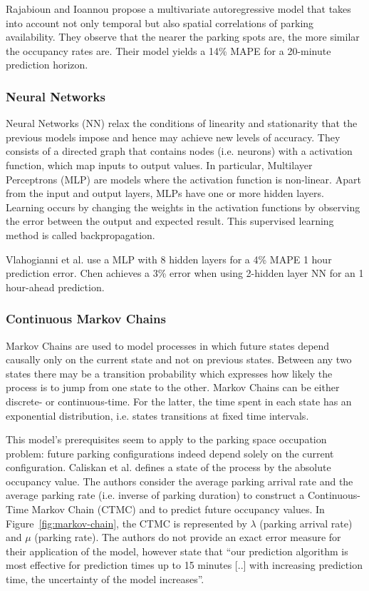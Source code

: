 \documentclass{article}
\begin{document}
\vspace{2mm}
Rajabioun and Ioannou\cite{Rajabioun} propose a multivariate autoregressive model that takes into account not only temporal but also spatial correlations of parking availability. They observe that the nearer the parking spots are, the more similar the occupancy rates are. Their model yields a 14\% MAPE for a 20-minute prediction horizon.

\subsubsection{Neural Networks}
\label{sec:neural-networks}
Neural Networks (NN) relax the conditions of linearity and stationarity that the previous models impose and hence may achieve new levels of accuracy. They consists of a directed graph that contains nodes (i.e. neurons) with a  activation function, which map inputs to output values. In particular, Multilayer Perceptrons (MLP) are models where the activation function is non-linear. Apart from the input and output layers, MLPs have one or more hidden layers. Learning occurs by changing the weights in the activation functions by observing the error between the output and expected result. This supervised learning method is called backpropagation.

\vspace{2mm}
Vlahogianni et al.\cite{Vlahogianni} use a MLP with 8 hidden layers for a 4\% MAPE 1 hour prediction error. Chen\cite{Chen} achieves a 3\% error when using 2-hidden layer NN for an 1 hour-ahead prediction.

\subsubsection{Continuous Markov Chains}
Markov Chains are used to model processes in which future states depend causally only on the current state and not on previous states. Between any two states there may be a transition probability which expresses how likely the process is to jump from one state to the other. Markov Chains can be either discrete- or continuous-time. For the latter, the time spent in each state has an exponential distribution, i.e. states transitions at fixed time intervals.

\vspace{2mm}
This model's prerequisites seem to apply to the parking space occupation problem: future parking configurations indeed depend solely on the current configuration. Caliskan et al.\cite{Caliskan2007} defines a state of the process by the absolute occupancy value. The authors consider the average parking arrival rate and the average parking rate (i.e. inverse of parking duration) to construct a Continuous-Time Markov Chain (CTMC) and to predict future occupancy values. In Figure~\ref{fig:markov-chain}, the CTMC is represented by $\lambda$ (parking arrival rate) and $\mu$ (parking rate). The authors do not provide an exact error measure for their application of the model, however state that ``our prediction algorithm is most effective for prediction times up to 15 minutes [..] with increasing prediction time, the uncertainty of the model increases''.
\end{document}
